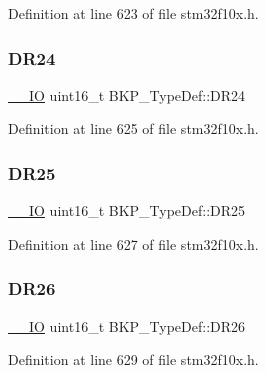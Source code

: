 Definition at line 623 of file stm32f10x.\+h.

\mbox{\label{struct_b_k_p___type_def_ad3797fc4d32046aef5680ddd0d890368}} 
\subsubsection{\texorpdfstring{D\+R24}{DR24}}
{\footnotesize\ttfamily \hyperlink{core__sc300_8h_aec43007d9998a0a0e01faede4133d6be}{\+\_\+\+\_\+\+IO} uint16\+\_\+t B\+K\+P\+\_\+\+Type\+Def\+::\+D\+R24}



Definition at line 625 of file stm32f10x.\+h.

\mbox{\label{struct_b_k_p___type_def_a26779c5c85be6c3a5ea219c980be4ae2}} 
\subsubsection{\texorpdfstring{D\+R25}{DR25}}
{\footnotesize\ttfamily \hyperlink{core__sc300_8h_aec43007d9998a0a0e01faede4133d6be}{\+\_\+\+\_\+\+IO} uint16\+\_\+t B\+K\+P\+\_\+\+Type\+Def\+::\+D\+R25}



Definition at line 627 of file stm32f10x.\+h.

\mbox{\label{struct_b_k_p___type_def_a04dc1fb867bdaa735d2036ac584f541b}} 
\subsubsection{\texorpdfstring{D\+R26}{DR26}}
{\footnotesize\ttfamily \hyperlink{core__sc300_8h_aec43007d9998a0a0e01faede4133d6be}{\+\_\+\+\_\+\+IO} uint16\+\_\+t B\+K\+P\+\_\+\+Type\+Def\+::\+D\+R26}



Definition at line 629 of file stm32f10x.\+h.

\mbox{\label{struct_b_k_p___type_def_ad5e851ff7c4e78c3ec10bedf4cbec918}} 
